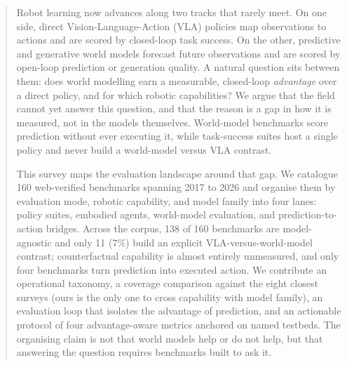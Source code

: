 \begin{abstract}
Robot learning now advances along two tracks that rarely meet. On one side, direct
Vision-Language-Action (VLA) policies map observations to actions and are scored by closed-loop task
success. On the other, predictive and generative world models forecast future observations and are
scored by open-loop prediction or generation quality. A natural question sits between them: does
world modelling earn a measurable, closed-loop \emph{advantage} over a direct policy, and for which
robotic capabilities? We argue that the field cannot yet answer this question, and that the reason
is a gap in how it is measured, not in the models themselves. World-model benchmarks score
prediction without ever executing it, while task-success suites host a single policy and never build
a world-model versus VLA contrast.

This survey maps the evaluation landscape around that gap. We catalogue 160 web-verified benchmarks
spanning 2017 to 2026 and organise them by evaluation mode, robotic capability, and model family
into four lanes: policy suites, embodied agents, world-model evaluation, and prediction-to-action
bridges. Across the corpus, 138 of 160 benchmarks are model-agnostic and only 11 (7\%) build an
explicit VLA-versus-world-model contrast; counterfactual capability is almost entirely unmeasured,
and only four benchmarks turn prediction into executed action. We contribute an operational
taxonomy, a coverage comparison against the eight closest surveys (ours is the only one to cross
capability with model family), an evaluation loop that isolates the advantage of prediction, and an
actionable protocol of four advantage-aware metrics anchored on named testbeds. The organising claim
is not that world models help or do not help, but that answering the question requires benchmarks
built to ask it.
\end{abstract}
